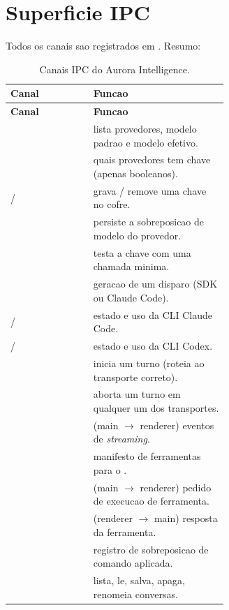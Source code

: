 \section{Superficie IPC}

Todos os canais sao registrados em . Resumo:

\begin{longtable}{l P{0.62\linewidth}}
\caption{Canais IPC do Aurora Intelligence.}\\
\toprule
\textbf{Canal} & \textbf{Funcao} \\
\midrule
\endfirsthead
\toprule
\textbf{Canal} & \textbf{Funcao} \\
\midrule
\endhead
\bottomrule
\endfoot
{}    & lista provedores, modelo padrao e modelo efetivo. \\
    & quais provedores tem chave (apenas booleanos). \\
 /  & grava / remove uma chave no cofre. \\
         & persiste a sobreposicao de modelo do provedor. \\
   & testa a chave com uma chamada minima. \\
  & geracao de um disparo (SDK ou Claude Code). \\
 /  & estado e uso da CLI Claude Code. \\
 /  & estado e uso da CLI Codex. \\
        & inicia um turno (roteia ao transporte correto). \\
        & aborta um turno em qualquer um dos transportes. \\
        & (main $\rightarrow$ renderer) eventos de \emph{streaming}. \\
 & manifesto de ferramentas para o . \\
         & (main $\rightarrow$ renderer) pedido de execucao de ferramenta. \\
       & (renderer $\rightarrow$ main) resposta da ferramenta. \\
 & registro de sobreposicao de comando aplicada. \\
            & lista, le, salva, apaga, renomeia conversas. \\
\bottomrule
\end{longtable}

